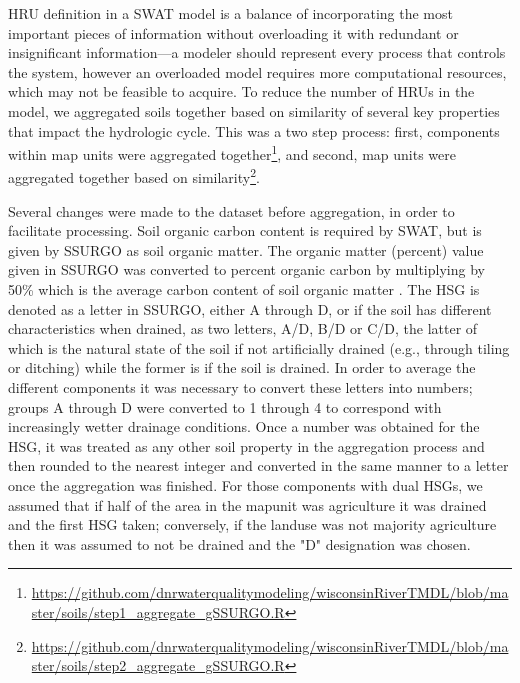 HRU definition in a SWAT model is a balance of incorporating the most important
pieces of information without overloading it with redundant or insignificant
information---a modeler should represent every process that controls the system,
however an overloaded model requires more computational resources, which may not
be feasible to acquire. To reduce the number of HRUs in the model, we aggregated
soils together based on similarity of several key properties that impact the
hydrologic cycle. This was a two step process: first, components within map
units were aggregated
together\footnote{\url{https://github.com/dnrwaterqualitymodeling/wisconsinRiverTMDL/blob/master/soils/step1_aggregate_gSSURGO.R}},
and second, map units were aggregated together based on
similarity\footnote{\url{https://github.com/dnrwaterqualitymodeling/wisconsinRiverTMDL/blob/master/soils/step2_aggregate_gSSURGO.R}}.

Several changes were made to the dataset before aggregation, in order to
facilitate processing. Soil organic carbon content is required by SWAT, but is
given by SSURGO as soil organic matter. The organic matter (percent) value given in SSURGO
was converted to percent organic carbon by multiplying by 50\% which is the average carbon
content of soil organic matter \citep{brady_elements_2004}. The HSG is
denoted as a letter in SSURGO, either A through D, or if the soil has different
characteristics when drained, as two letters, A/D, B/D or C/D, the latter of
which is the natural state of the soil if not artificially drained (e.g.,
through tiling or ditching) while the former is if the soil is drained. In order
to average the different components it was necessary to convert these letters
into numbers; groups A through D were converted to 1 through 4 to correspond
with increasingly wetter drainage conditions. Once a number was obtained for the
HSG, it was treated as any other soil property in the aggregation process and
then rounded to the nearest integer and converted in the same manner to a letter
once the aggregation was finished. For those components with dual HSGs, we
assumed that if half of the area in the mapunit was agriculture it was drained
and the first HSG taken; conversely, if the landuse was not majority agriculture
then it was assumed to not be drained and the "D" designation was chosen.

